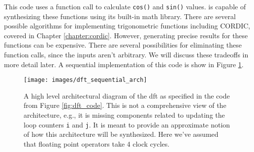 This code uses a function call to calculate \lstinline|cos()| and \lstinline|sin()| values. \VHLS is capable of synthesizing these functions using its built-in math library. There are several possible algorithms \cite{detrey07hotbm} for implementing trigonometric functions including CORDIC, covered in Chapter \ref{chapter:cordic}.  However, generating precise results for these functions can be expensive.  There are several possibilities for eliminating these function calls, since the inputs aren't arbitrary.  We will discuss these tradeoffs in more detail later.    A sequential implementation of this code is show in Figure \ref{fig:dft_sequential_arch}. 


\begin{figure}
\centering

\texttt{[image: images/dft\_sequential\_arch]}
\caption{ A high level architectural diagram of the \gls{dft} as specified in the code from Figure \ref{fig:dft_code}. This is not a comprehensive view of the architecture, e.g., it is missing components related to updating the loop counters \lstinline|i| and \lstinline|j|. It is meant to provide an approximate notion of how this architecture will be synthesized.  Here we've assumed that floating point operators take 4 clock cycles.}
\label{fig:dft_sequential_arch}
\end{figure}

